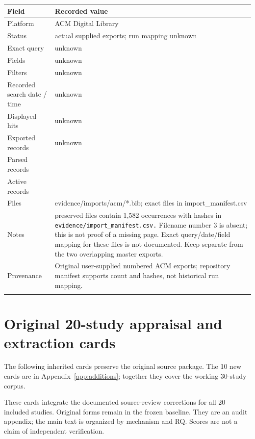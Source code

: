 \begin{longtable}{>{\raggedright\arraybackslash}p{}>{\raggedright\arraybackslash}p{}}
\toprule
\textbf{Field} & \textbf{Recorded value}\\\midrule\endhead
Platform & ACM Digital Library\\\addlinespace
Status & actual supplied exports; run mapping unknown\\\addlinespace
Exact query & unknown\\\addlinespace
Fields & unknown\\\addlinespace
Filters & unknown\\\addlinespace
Recorded search date / time & unknown\\\addlinespace
Displayed hits & unknown\\\addlinespace
Exported records & unknown\\\addlinespace
Parsed records & 1582\\\addlinespace
Active records & 1582\\\addlinespace
Files & evidence/imports/acm/*.bib; exact files in import\_manifest.csv\\\addlinespace
Notes & 79 preserved files contain 1,582 occurrences with hashes in \nolinkurl{evidence/import_manifest.csv.} Filename number 3 is absent; this is not proof of a missing page. Exact query/date/field mapping for these files is not documented. Keep separate from the two overlapping master exports.\\\addlinespace
Provenance & Original user-supplied numbered ACM exports; repository manifest supports count and hashes, not historical run mapping.\\\addlinespace
\bottomrule\end{longtable}

\section{Original 20-study appraisal and extraction cards}
The following inherited cards preserve the original source package. The 10 new cards are in Appendix~\ref{app:additions}; together they cover the working 30-study corpus.

These cards integrate the documented source-review corrections for all 20 included studies. Original forms remain in the frozen baseline. They are an audit appendix; the main text is organized by mechanism and RQ. Scores are not a claim of independent verification.

